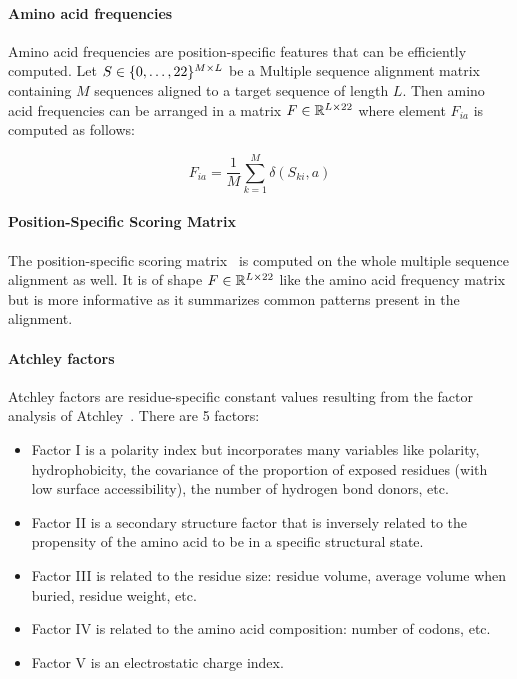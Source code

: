         \paragraph{Amino acid frequencies}

            Amino acid frequencies are position-specific features that can be efficiently computed.
            Let $S \in \{0, \ldots, 22\}^{M \times L}$ be a
            Multiple sequence alignment matrix containing $M$ sequences aligned to a target
            sequence of length $L$. Then amino acid frequencies can be arranged
            in a matrix $F \in \mathbb{R}^{L \times 22}$
            where element $F_{ia}$ is computed as follows:

            \begin{equation}
                F_{ia} = \frac{1}{M} \sum\limits_{k=1}^M \delta(S_{ki}, a)
            \end{equation}

        \paragraph{Position-Specific Scoring Matrix}

            The position-specific scoring matrix~\cite{jones1999protein} is 
            computed on the whole multiple sequence alignment as well.
            It is of shape $F \in \mathbb{R}^{L \times 22}$ like the amino acid frequency matrix
            but is more informative as it summarizes common patterns present in the alignment.

        \paragraph{Atchley factors}

            Atchley factors are residue-specific constant values resulting from the factor analysis
            of Atchley~\cite{Atchley2005}. There are 5 factors:
            \begin{itemize}
                \item Factor I is a polarity index but incorporates many variables like polarity, hydrophobicity,
                    the covariance of the proportion of exposed residues (with low surface accessibility), the
                    number of hydrogen bond donors, etc.
                \item Factor II is a secondary structure factor that is inversely related to the propensity of the
                    amino acid to be in a specific structural state.
                \item Factor III is related to the residue size: residue volume, average volume when buried, residue weight, etc.
                \item Factor IV is related to the amino acid composition: number of codons, etc.
                \item Factor V is an electrostatic charge index.
            \end{itemize}

